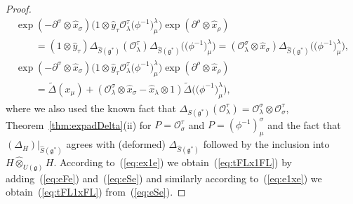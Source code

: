 \documentclass[10pt,a4paper]{amsart}
\def\gg{\mathfrak{g}}
\def\OO{\mathcal{O}}
\def\hx{\hat{x}}
\def\hy{\hat{y}}
\numberwithin{equation}{section}
\begin{document}
\begin{proof}
\begin{gather}
\exp(-\partial^\sigma\otimes\hx_\sigma)\big(1\otimes \hy_\tau\OO^\tau_\lambda\big(\phi^{-1}\big)^\lambda_\mu\big)\exp(\partial^\rho\otimes\hx_\rho) \nonumber\\
\qquad{} = (1\otimes\hy_\tau)\Delta_{\hat{S}(\gg^*)}(\OO^\tau_\lambda)\Delta_{\hat{S}(\gg^*)}\big(\big(\phi^{-1}\big)^\lambda_\mu\big)
 = (\mathcal{O}^\sigma_\lambda\otimes\hx_\sigma)\Delta_{\hat{S}(\gg^*)}\big(\big(\phi^{-1}\big)^\lambda_\mu\big),\nonumber\\
\label{eq:eSe}
\exp(-\partial^\sigma\otimes\hx_\sigma)\big(1\otimes \hy_\tau\OO^\tau_\lambda\big(\phi^{-1}\big)^\lambda_\mu\big)\exp(\partial^\rho\otimes\hx_\rho)\nonumber\\
\qquad{}
= \tilde\Delta(x_\mu) + (\mathcal{O}^\sigma_\lambda\otimes\hx_\sigma-\hx_\lambda\otimes 1)\tilde\Delta\big(\big(\phi^{-1}\big)^\lambda_\mu\big),
\end{gather}
where we also used the known fact \cite{halg} that $\Delta_{S(\gg^*)}(\mathcal{O}^\tau_\lambda) = \mathcal{O}_\lambda^\sigma\otimes\mathcal{O}^\tau_\sigma$, Theorem~\ref{thm:expadDelta}(ii) for $P = \OO^\tau_\sigma$ and $P = (\phi^{-1})^\sigma_\mu$ and the fact that $(\Delta_H)|_{\hat{S}(\gg^*)}$ agrees with (deformed) $\Delta_{\hat{S}(\gg^*)}$ followed by the inclusion into $H\hat\otimes_{U(\gg)}H$. According to~(\ref{eq:ex1e}) we obtain~(\ref{eq:tFLx1FL}) by adding~(\ref{eq:eFe}) and~(\ref{eq:eSe}) and similarly according to~(\ref{eq:e1xe}) we obtain~(\ref{eq:tFL1xFL}) from~(\ref{eq:eSe}).


\end{proof}
\end{document}
